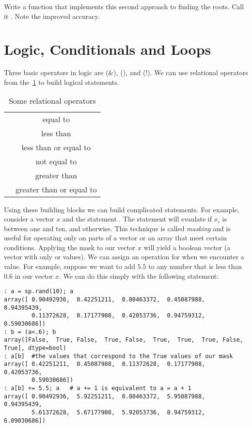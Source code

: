 \begin{problem}
Write a function that implements this second approach to finding the roots. Call it .  Note the improved accuracy.
\end{problem}

\section*{Logic, Conditionals and Loops}
Three basic operators in logic are  (\&),  (\textbar), and  (!). We can use relational operators from the~\ref{tbl:relops} to build logical statements.

\begin{table}[h!]
\begin{center}
\begin{tabular}{|c|c|}
	\hline
	\li{==} & equal to\\
        \li{<} & less than\\
	\li{<=} & less than or equal to\\
	\li{\!=} & not equal to\\
	\li{>} & greater than\\
	\li{>=} & greater than or equal to\\
	\hline
\end{tabular}
\caption{Some relational operators}
\label{tbl:relops}
\end{center}
\end{table}

Using these building blocks we can build complicated statements. For example, consider a vector $x$ and the statement .  The statement will evaulate  if $x_i$ is between one and ten, and  otherwise.  This technique is called \emph{masking} and is useful for operating only on parts of a vector or an array that meet certain conditions.  Applying the mask to our vector $x$ will yield a boolean vector (a vector with only  or  values).  We can assign an operation for when we encounter a  value.  For example, suppose we want to add $5.5$ to any number that is less than $0.6$ in our vector $x$.  We can do this simply with the following statement:
\begin{lstlisting}[style=python]
: a = sp.rand(10); a
array([ 0.90492936,  0.42251211,  0.80463372,  0.45087988,  0.94395439,
        0.11372628,  0.17177908,  0.42053736,  0.94759312,  0.59030686])
: b = (a<.6); b
array([False,  True, False,  True, False,  True,  True,  True, False,  True], dtype=bool)
: a[b]  #the values that correspond to the True values of our mask
array([ 0.42251211,  0.45087988,  0.11372628,  0.17177908,  0.42053736,
        0.59030686])
: a[b] += 5.5; a   # a += 1 is equivalent to a = a + 1
array([ 0.90492936,  5.92251211,  0.80463372,  5.95087988,  0.94395439,
        5.61372628,  5.67177908,  5.92053736,  0.94759312,  6.09030686])
\end{lstlisting}


